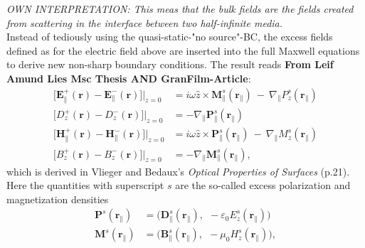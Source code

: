 \textit{OWN INTERPRETATION: \@ This meas that the bulk fields are the fields created from scattering in the interface between two half-infinite media.} \\
Instead of tediously using the quasi-static-"no source"-BC, the excess fields defined as for the electric field above are inserted into the full Maxwell equations to derive new non-sharp boundary conditions.
The result reads
%
\textbf{From Leif Amund Lies Msc Thesis AND GranFilm-Article}: \\
%
\begin{subequations}
   \label{exFieldBC} %
\begin{align}
   \big[ \boldsymbol{E}^+_{\parallel} (\boldsymbol{r}) - \boldsymbol{E}^-_{\parallel} (\boldsymbol{r}) \big] \bigg\rvert _{z = 0} 
       &= i \omega \hat{z} \times \! \boldsymbol{M}^s_{\parallel}(\boldsymbol{r}_{\parallel}) \:-\: \nabla\!_{\parallel} P^s_{z}(\boldsymbol{r}_{\parallel}) 
       \label{exFieldBC1} \\ 
   \big[ D^+_{z} (\boldsymbol{r}) - D^-_{z} (\boldsymbol{r}) \big] \bigg\rvert _{z = 0} 
      &= - \nabla\!_{\parallel} \boldsymbol{P}^s_{\parallel}(\boldsymbol{r}_{\parallel}) 
      \label{exFieldBC2} \\ 
   \big[ \boldsymbol{H}^+_{\parallel} (\boldsymbol{r}) - \boldsymbol{H}^-_{\parallel} (\boldsymbol{r}) \big] \bigg\rvert _{z = 0} 
      &= i \omega \hat{z} \times \! \boldsymbol{P}^s_{\parallel}(\boldsymbol{r}_{\parallel}) \:-\: \nabla\!_{\parallel} M^s_{z}(\boldsymbol{r}_{\parallel})  
      \label{exFieldBC3} \\ 
   \big[ B^+_{z} (\boldsymbol{r}) - B^-_{z} (\boldsymbol{r}) \big] \bigg\rvert _{z = 0} 
      &= - \nabla\!_{\parallel} \boldsymbol{M}^s_{\parallel}(\boldsymbol{r}_{\parallel}), 
      \label{exFieldBC4}  
\end{align}
\end{subequations}
%
which is derived in Vlieger and Bedaux's \textit{Optical Properties of Surfaces} (p.21). Here the quantities with superscript $s$ are the so-called excess polarization and magnetization densities
\begin{subequations}
\label{surfQuant} %
\begin{align}
   \boldsymbol{P}^s(\boldsymbol{r}\!_{\parallel}) &= \big( \boldsymbol{D}^s_{\parallel}(\boldsymbol{r}\!_{\parallel}), \:\: - \varepsilon_0 E^s_{z}(\boldsymbol{r}\!_{\parallel}) \big) \label{surfQuant1}\\
   \boldsymbol{M}^s(\boldsymbol{r}\!_{\parallel}) &= \big( \boldsymbol{B}^s_{\parallel}(\boldsymbol{r}\!_{\parallel}), \:\: - \mu_0 H^s_{z}(\boldsymbol{r}\!_{\parallel}) \big) , \label{surfQuant2}
\end{align}
\end{subequations}

